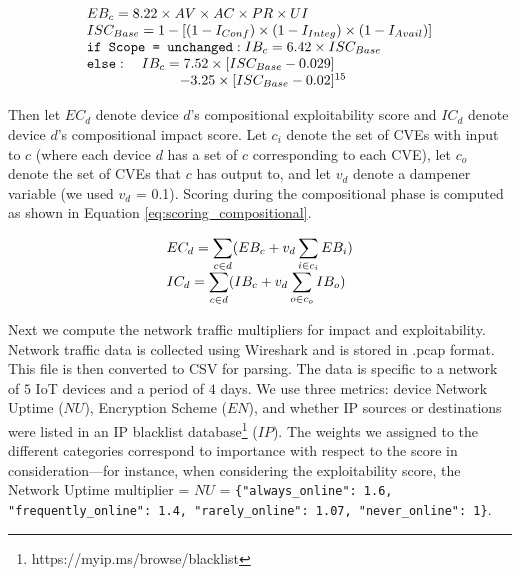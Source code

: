 \begin{equation}
\begin{array}{ll@{}ll}
EB_c = 8.22 \times AV \times AC \times PR \times UI \\
ISC_{Base} = 1 - [(1-I_{Conf}) \times (1-I_{Integ}) \times (1-I_{Avail})] \\
\texttt{if Scope = unchanged}: IB_c = 6.42 \times ISC_{Base} \\
\texttt{else}: \ \ \  IB_c = 7.52 \times [ISC_{Base}-0.029] \\
\ \ \ \ \ \ \ \ \ \ \ \ \ \ \ \ \ \ \ \ - 3.25 \times [ISC_{Base}-0.02]^{15}
\end{array}
\label{eq:scoring_circuit_construction}
\end{equation}

Then let $EC_d$ denote device $d$'s compositional exploitability score and $IC_d$ denote device $d$'s compositional impact score. Let $c_i$ denote the set of CVEs with input to $c$ (where each device $d$ has a set of $c$ corresponding to each CVE), let $c_o$ denote the set of CVEs that $c$ has output to, and let $v_d$ denote a dampener variable (we used $v_d$ = 0.1). Scoring during the compositional phase is computed as shown in Equation \ref{eq:scoring_compositional}.

\begin{equation}
\begin{array}{ll@{}ll}
EC_d = {\displaystyle\sum_{c \in d}(EB_c+v_d\displaystyle\sum_{i\in c_i}{EB_i}}) \\
IC_d = {\displaystyle\sum_{c \in d}(IB_c+v_d\displaystyle\sum_{o\in c_o}{IB_o}}) \\
\end{array}
\label{eq:scoring_compositional}
\end{equation}

Next we compute the network traffic multipliers for impact and exploitability. Network traffic data is collected using Wireshark \cite{orebaugh2006wireshark} and is stored in .pcap format. This file is then converted to CSV for parsing. The data is specific to a network of $5$ IoT devices and a period of $4$ days. We use three metrics: device Network Uptime ($NU$), Encryption Scheme ($EN$), and whether IP sources or destinations were listed in an IP blacklist database\footnote{https://myip.ms/browse/blacklist} ($IP$). The weights we assigned to the different categories correspond to importance with respect to the score in consideration---for instance, when considering the exploitability score, the Network Uptime multiplier = $NU$ = \texttt{\{"always\_online": 1.6, "frequently\_online": 1.4, "rarely\_online": 1.07, "never\_online": 1\}}.

